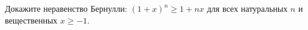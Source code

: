 Докажите неравенство Бернулли: $(1 + x)^n \ge 1 + nx$ для всех натуральных $n$ и вещественных $x \ge
-1$.
